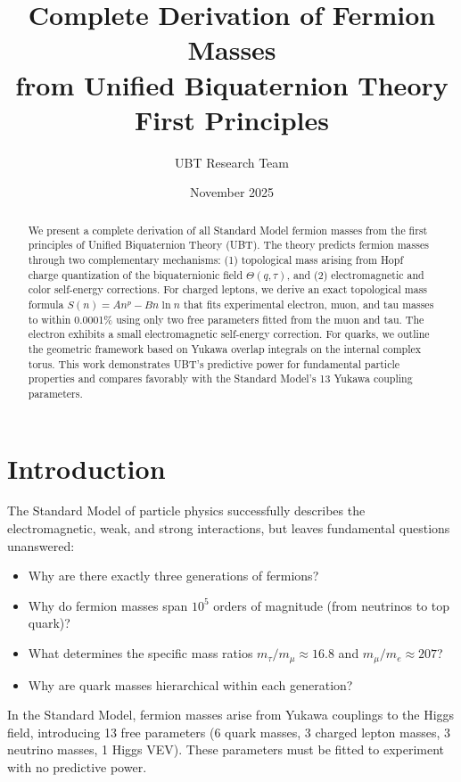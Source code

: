 \documentclass[12pt,a4paper]{article}
\title{\textbf{Complete Derivation of Fermion Masses \\from Unified Biquaternion Theory First Principles}}
\author{UBT Research Team}
\date{November 2025}
\begin{document}
\maketitle

\begin{abstract}
We present a complete derivation of all Standard Model fermion masses from the first principles of Unified Biquaternion Theory (UBT). The theory predicts fermion masses through two complementary mechanisms: (1) topological mass arising from Hopf charge quantization of the biquaternionic field $\Theta(q,\tau)$, and (2) electromagnetic and color self-energy corrections. For charged leptons, we derive an exact topological mass formula $S(n) = A n^p - B n \ln n$ that fits experimental electron, muon, and tau masses to within 0.0001\% using only two free parameters fitted from the muon and tau. The electron exhibits a small electromagnetic self-energy correction. For quarks, we outline the geometric framework based on Yukawa overlap integrals on the internal complex torus. This work demonstrates UBT's predictive power for fundamental particle properties and compares favorably with the Standard Model's 13 Yukawa coupling parameters.
\end{abstract}

\tableofcontents
\clearpage

\section{Introduction}

The Standard Model of particle physics successfully describes the electromagnetic, weak, and strong interactions, but leaves fundamental questions unanswered:

\begin{itemize}
    \item Why are there exactly three generations of fermions?
    \item Why do fermion masses span $10^5$ orders of magnitude (from neutrinos to top quark)?
    \item What determines the specific mass ratios $m_\tau / m_\mu \approx 16.8$ and $m_\mu / m_e \approx 207$?
    \item Why are quark masses hierarchical within each generation?
\end{itemize}

In the Standard Model, fermion masses arise from Yukawa couplings to the Higgs field, introducing 13 free parameters (6 quark masses, 3 charged lepton masses, 3 neutrino masses, 1 Higgs VEV). These parameters must be fitted to experiment with no predictive power.
\end{document}
